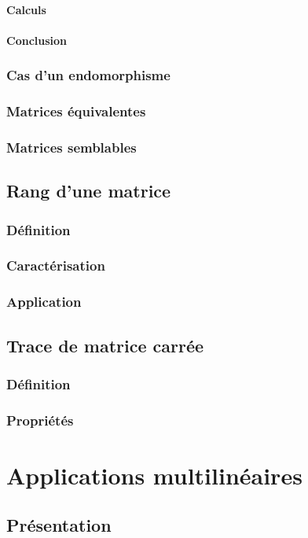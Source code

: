 \documentclass[12pt,a4paper,french]{book}
\begin{document}
			\subsubsection{Calculs}
			\subsubsection{Conclusion}
		\subsection{Cas d'un endomorphisme}
		\subsection{Matrices équivalentes}
		\subsection{Matrices semblables}
	\section{Rang d'une matrice}
		\subsection{Définition}
		\subsection{Caractérisation}
		\subsection{Application}
	\section{Trace de matrice carrée}
		\subsection{Définition}
		\subsection{Propriétés}
				
\chapter{Applications multilinéaires}
	\section{Présentation}
\end{document}

